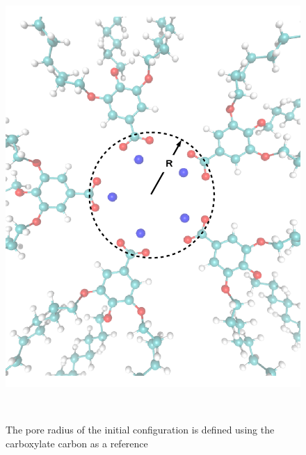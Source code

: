 \documentclass{article}
\begin{document}
  \begin{figure}[ht]
 	\centering
 	\includegraphics[width=\textwidth]{pore_radius_illustration.png}
	\caption{The pore radius of the initial configuration is defined using the 
        carboxylate carbon as a reference}~\label{fig:pore_radius_illustration}
  \end{figure}
  
\end{document}
